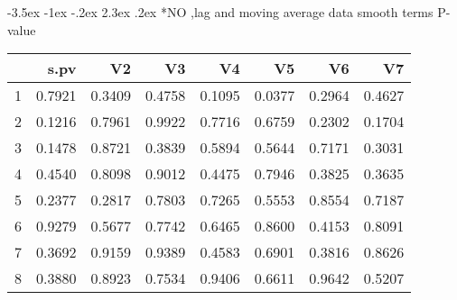 \documentclass[a4paper, 12pt]{article}
\makeatletter
\def\Large{\fontsize{16}{24}\selectfont}
\renewcommand\section{\@startsection {section}{1}{\z@}%
                                   {-3.5ex \@plus -1ex \@minus -.2ex}%
                                   {2.3ex \@plus.2ex}%
                                   {\centering\normalfont\Large\bfseries}}
\makeatother
\begin{document}
\section*{NO ,lag and moving average data}
smooth terms P-value
\begin{table}[ht]
\centering
\begin{tabular}{rrrrrrrr}
  \hline
 & s.pv & V2 & V3 & V4 & V5 & V6 & V7 \\
  \hline
1 & 0.7921 & 0.3409 & 0.4758 & 0.1095 & 0.0377 & 0.2964 & 0.4627 \\
  2 & 0.1216 & 0.7961 & 0.9922 & 0.7716 & 0.6759 & 0.2302 & 0.1704 \\
  3 & 0.1478 & 0.8721 & 0.3839 & 0.5894 & 0.5644 & 0.7171 & 0.3031 \\
  4 & 0.4540 & 0.8098 & 0.9012 & 0.4475 & 0.7946 & 0.3825 & 0.3635 \\
  5 & 0.2377 & 0.2817 & 0.7803 & 0.7265 & 0.5553 & 0.8554 & 0.7187 \\
  6 & 0.9279 & 0.5677 & 0.7742 & 0.6465 & 0.8600 & 0.4153 & 0.8091 \\
  7 & 0.3692 & 0.9159 & 0.9389 & 0.4583 & 0.6901 & 0.3816 & 0.8626 \\
  8 & 0.3880 & 0.8923 & 0.7534 & 0.9406 & 0.6611 & 0.9642 & 0.5207 \\
   \hline
\end{tabular}
\end{table}
\end{document}
